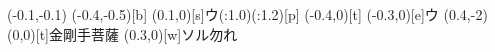 \documentclass[m_shidai]{subfiles}
\begin{document}
{{\aki[2]{\q}\qyu\moveTo(-0.1,-0.1)\iro{\c}\sho{}%
\aki[0.4]{\hs}\iro{\c}\sho\tsuya{\q}}%
\karifu(-0.4,-0.5)[b]{}
{\lwoo\tsuya{\q}\ooyu{\q}\kili[e]\moji(0.1,0)[s]{ウ}\base(\s:1.0)\modori*(\w:1.2)[p]\orisute\iro{\k}\sho\iro[2]{\k}\sho}
\karifu(-0.4,0)[t]{}{\sho\tsuya{\q}\aki\tsuya{\q}}
\newline
{\HUGe%
{\chikara{\lw}%
\aki[0.5]{\q}\qyu\矢[w]\aki%
\aki\tsuyamochi{\q}\moji(-0.3,0)[e]{ウ}\sho%
\moveTo(0.4,-2)\iro{\c}\sho\tsuya{\q}}%
\karifu(0,0)[t]{金剛手菩薩}%
{\chikara{\q}\chi\矢[sw]%
\iro{\k}\sho\矢[nw]%
\kak{}\moji(0.3,0)[w]{ソル勿れ}\kaigyo%
\kak\矢[s]\tsu}%
}
}
\end{document}
